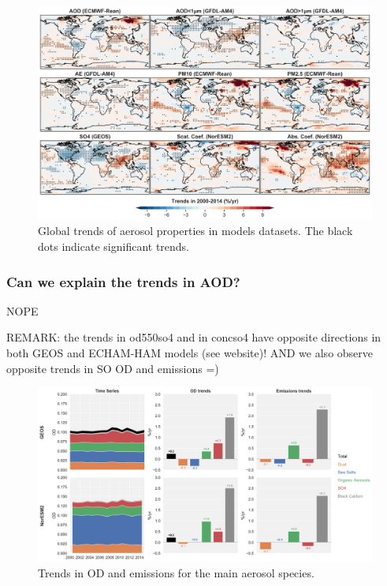 \documentclass[journal abbreviation, manuscript]{copernicus}
\begin{document}
\begin{figure}
 \includegraphics[width=\columnwidth]{../scripts/figs/trends_map.png}
 \caption{Global trends of aerosol properties in models datasets. The black dots indicate significant trends.}
 \label{mod_map_trends}
\end{figure}

\subsubsection{Can we explain the trends in AOD?}
NOPE

REMARK: the trends in od550so4 and in concso4 have opposite directions in both GEOS and ECHAM-HAM models (see website)!
AND we also observe opposite trends in SO OD and emissions =)

\begin{figure}
 \includegraphics[width=\columnwidth]{../scripts/figs/rel_species_trends.png}
 \caption{Trends in OD and emissions for the main aerosol species.}
 \label{species_abs_trends}
\end{figure}
\end{document}

